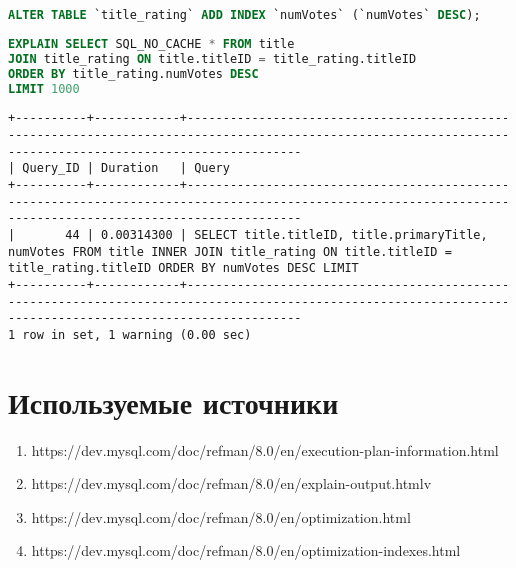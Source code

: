 \documentclass[12pt,a4paper]{article}
\begin{document}
\begin{lstlisting}[language=SQL]
ALTER TABLE `title_rating` ADD INDEX `numVotes` (`numVotes` DESC);
\end{lstlisting}

\begin{lstlisting}[language=SQL]
EXPLAIN SELECT SQL_NO_CACHE * FROM title
JOIN title_rating ON title.titleID = title_rating.titleID
ORDER BY title_rating.numVotes DESC
LIMIT 1000
\end{lstlisting}

\begin{lstlisting}[basicstyle = \tiny\ttfamily, columns = fixed]
+----------+------------+------------------------------------------------------------------------------------------------------------------------------------------------------------
| Query_ID | Duration   | Query                                                                                                                                                      
+----------+------------+------------------------------------------------------------------------------------------------------------------------------------------------------------
|       44 | 0.00314300 | SELECT title.titleID, title.primaryTitle, numVotes FROM title INNER JOIN title_rating ON title.titleID = title_rating.titleID ORDER BY numVotes DESC LIMIT 
+----------+------------+------------------------------------------------------------------------------------------------------------------------------------------------------------
1 row in set, 1 warning (0.00 sec)
\end{lstlisting}

\section{Используемые источники}
\begin{enumerate}
    \item https://dev.mysql.com/doc/refman/8.0/en/execution-plan-information.html
    \item https://dev.mysql.com/doc/refman/8.0/en/explain-output.htmlv
    \item https://dev.mysql.com/doc/refman/8.0/en/optimization.html
    \item https://dev.mysql.com/doc/refman/8.0/en/optimization-indexes.html
\end{enumerate}
\end{document}
